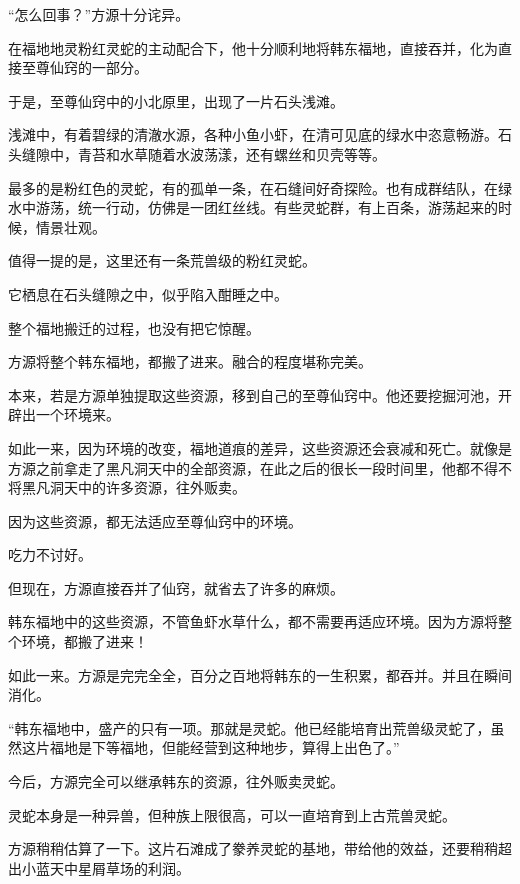 
\begin{this_body}



“怎么回事？”方源十分诧异。

在福地地灵粉红灵蛇的主动配合下，他十分顺利地将韩东福地，直接吞并，化为直接至尊仙窍的一部分。

于是，至尊仙窍中的小北原里，出现了一片石头浅滩。

浅滩中，有着碧绿的清澈水源，各种小鱼小虾，在清可见底的绿水中恣意畅游。石头缝隙中，青苔和水草随着水波荡漾，还有螺丝和贝壳等等。

最多的是粉红色的灵蛇，有的孤单一条，在石缝间好奇探险。也有成群结队，在绿水中游荡，统一行动，仿佛是一团红丝线。有些灵蛇群，有上百条，游荡起来的时候，情景壮观。

值得一提的是，这里还有一条荒兽级的粉红灵蛇。

它栖息在石头缝隙之中，似乎陷入酣睡之中。

整个福地搬迁的过程，也没有把它惊醒。

方源将整个韩东福地，都搬了进来。融合的程度堪称完美。

本来，若是方源单独提取这些资源，移到自己的至尊仙窍中。他还要挖掘河池，开辟出一个环境来。

如此一来，因为环境的改变，福地道痕的差异，这些资源还会衰减和死亡。就像是方源之前拿走了黑凡洞天中的全部资源，在此之后的很长一段时间里，他都不得不将黑凡洞天中的许多资源，往外贩卖。

因为这些资源，都无法适应至尊仙窍中的环境。

吃力不讨好。

但现在，方源直接吞并了仙窍，就省去了许多的麻烦。

韩东福地中的这些资源，不管鱼虾水草什么，都不需要再适应环境。因为方源将整个环境，都搬了进来！

如此一来。方源是完完全全，百分之百地将韩东的一生积累，都吞并。并且在瞬间消化。

“韩东福地中，盛产的只有一项。那就是灵蛇。他已经能培育出荒兽级灵蛇了，虽然这片福地是下等福地，但能经营到这种地步，算得上出色了。”

今后，方源完全可以继承韩东的资源，往外贩卖灵蛇。

灵蛇本身是一种异兽，但种族上限很高，可以一直培育到上古荒兽灵蛇。

方源稍稍估算了一下。这片石滩成了豢养灵蛇的基地，带给他的效益，还要稍稍超出小蓝天中星屑草场的利润。


\end{this_body}
